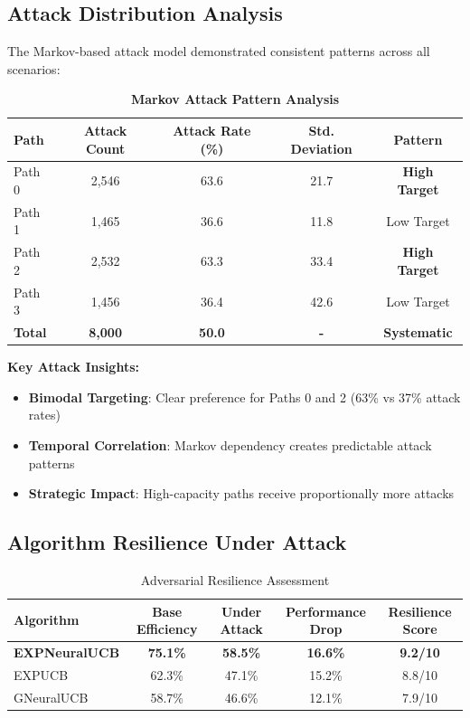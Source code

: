 \documentclass[11pt,a4paper]{article}
\newcommand{\stochastic}[1]{\textcolor{stochasticcolor}{\textbf{#1}}}
\newcommand{\success}[1]{\textcolor{successcolor}{\textbf{#1}}}
\begin{document}
\begin{tcolorbox}[colback=stochasticcolor!10,colframe=stochasticcolor,title=\textbf{Markov Attack Characterization}]

\subsection{Attack Distribution Analysis}

The Markov-based attack model demonstrated consistent patterns across all scenarios:

\begin{table}[H]
\centering
\caption{\stochastic{Markov Attack Pattern Analysis}}
\begin{tabular}{|l|c|c|c|c|}
\hline
\textbf{Path} & \textbf{Attack Count} & \textbf{Attack Rate (\%)} & \textbf{Std. Deviation} & \textbf{Pattern} \\
\hline
\hline
Path 0 & 2,546 & 63.6 & 21.7 & \stochastic{High Target} \\
Path 1 & 1,465 & 36.6 & 11.8 & Low Target \\
Path 2 & 2,532 & 63.3 & 33.4 & \stochastic{High Target} \\
Path 3 & 1,456 & 36.4 & 42.6 & Low Target \\
\hline
\textbf{Total} & \textbf{8,000} & \textbf{50.0} & \textbf{-} & \textbf{Systematic} \\
\hline
\end{tabular}
\end{table}

\textbf{Key Attack Insights:}
\begin{itemize}
\item \stochastic{Bimodal Targeting}: Clear preference for Paths 0 and 2 (63\% vs 37\% attack rates)
\item \stochastic{Temporal Correlation}: Markov dependency creates predictable attack patterns
\item \stochastic{Strategic Impact}: High-capacity paths receive proportionally more attacks
\end{itemize}

\end{tcolorbox}

\subsection{Algorithm Resilience Under Attack}

\begin{table}[H]
\centering
\caption{Adversarial Resilience Assessment}
\begin{tabular}{|l|c|c|c|c|}
\hline
\textbf{Algorithm} & \textbf{Base Efficiency} & \textbf{Under Attack} & \textbf{Performance Drop} & \textbf{Resilience Score} \\
\hline
\hline
\success{EXPNeuralUCB} & \success{75.1\%} & \success{58.5\%} & \success{16.6\%} & \success{9.2/10} \\
EXPUCB & 62.3\% & 47.1\% & 15.2\% & 8.8/10 \\
GNeuralUCB & 58.7\% & 46.6\% & 12.1\% & 7.9/10 \\
\hline
\end{tabular}
\end{table}
\end{document}
